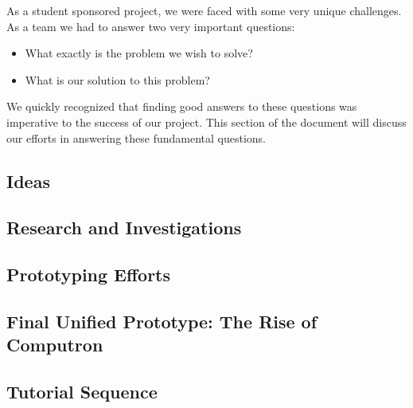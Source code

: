 As a student sponsored project, we were faced with some very unique
challenges. As a team we had to answer two very important questions:
\begin{itemize}
	\item What exactly is the problem we wish to solve?
	\item What is our solution to this problem?
\end{itemize}

We quickly recognized that finding good answers to these questions was imperative 
to the success of our project. This section of the document will discuss our efforts in 
answering these fundamental questions.\\

\subsection{Ideas}
	
\newpage

\subsection{Research and Investigations}
	
\newpage

\subsection{Prototyping Efforts}
	
\newpage

\subsection{Final Unified Prototype: The Rise of Computron}
	
\newpage

\subsection{Tutorial Sequence}
\label{section:tutorial}
	
\newpage
